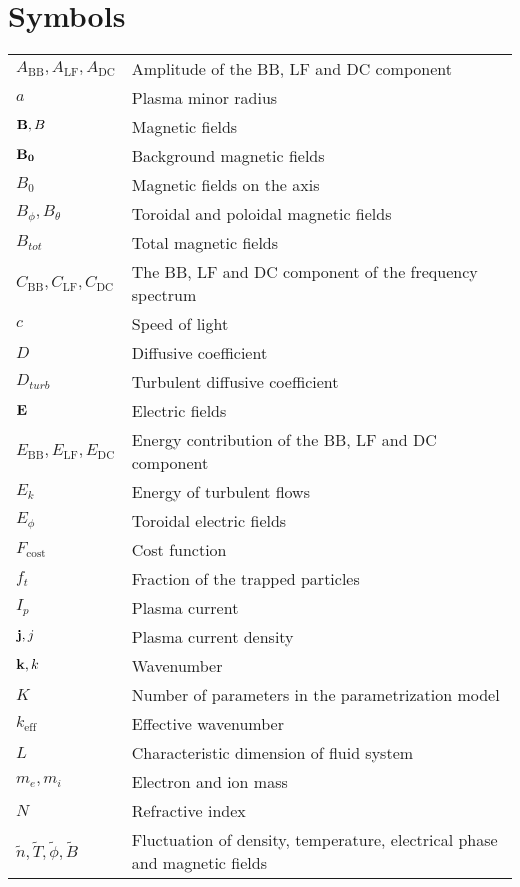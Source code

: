 \chapter*{Symbols}

\begin{longtable}{ll}


$A_\mathrm{BB}, A_\mathrm{LF}, A_\mathrm{DC}$ & Amplitude of the BB, LF and DC component  \\
$a$ & Plasma minor radius \\
$\boldsymbol{\mathrm{B}}, B$ & Magnetic fields \\
$\boldsymbol{\mathrm{B_{0}}}$ & Background magnetic fields \\
$B_{0}$ & Magnetic fields on the axis \\
$B_{\phi}, B_{\theta}$ & Toroidal and poloidal magnetic fields \\
$B_{tot}$ & Total magnetic fields \\
$C_\mathrm{BB}, C_\mathrm{LF}, C_\mathrm{DC}$ & The BB, LF and DC component of the frequency spectrum  \\
$c$ & Speed of light \\
$D$ & Diffusive coefficient \\
$D_{turb}$ & Turbulent diffusive coefficient \\
$\boldsymbol{\mathrm{E}}$ & Electric fields \\
$E_\mathrm{BB}, E_\mathrm{LF}, E_\mathrm{DC}$ & Energy contribution of the BB, LF and DC component  \\
$E_k$ & Energy of turbulent flows \\
$E_{\phi}$ & Toroidal electric fields \\
$F_\mathrm{cost}$ & Cost function \\
$f_t$ & Fraction of the trapped particles \\
$I_{p}$ & Plasma current \\
$\boldsymbol{\mathrm{j}}, j$ & Plasma current density \\
$\boldsymbol{\mathrm{k}}, k$ & Wavenumber \\
$K$ & Number of parameters in the parametrization model \\
$k_\mathrm{eff}$ & Effective wavenumber \\
$L$ & Characteristic dimension of fluid system \\
$m_e, m_i$ & Electron and ion mass \\
$N$ & Refractive index \\
$\tilde{n}, \tilde{T}, \tilde{\phi}, \tilde{B}$ & Fluctuation of density, temperature, electrical phase and magnetic fields \\

\end{longtable}
